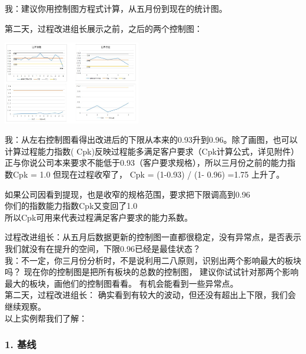 我：建议你用控制图方程式计算，从五月份到现在的统计图。

第二天，过程改进组长展示之前，之后的两个控制图：

\begin{description}
\item[]
\end{description}


\includegraphics[width=6cm]{控制图0.jpg}

我：从左右控制图看得出改进后的下限从本来的0.93升到0.96。除了画图，也可以计算过程能力指数(
Cpk)反映过程能多满足客户要求（Cpk计算公式，详见附件）\\
正与你说公司本来要求不能低于0.93（客户要求规格），所以三月份之前的能力指数Cpk
= 1.0 但现在过程收窄了， Cpk = (1-0.93) / (1- 0.96) =1.75 上升了。

如果公司因看到提现，也是收窄的规格范围，要求把下限调高到0.96\\
你们的指数能力指数Cpk又变回了1.0\\
所以Cpk可用来代表过程满足客户要求的能力系数。

过程改进组长：从五月后数据更新的控制图一直都很稳定，没有异常点，是否表示我们就没有在提升的空间，下限0.96已经是最佳状态？\\
我：不一定，你三月份分析时，不是说利用二八原则，识别出两个影响最大的板块吗？
现在你的控制图是把所有板块的总数的控制图，
建议你试试针对那两个影响最大的板块，画他们的控制图看看。
有机会能看到一些异常点。\\
第二天，过程改进组长：
确实看到有较大的波动，但还没有超出上下限，我们会继续观察。\\
以上实例帮我们了解：

\hypertarget{ux57faux7ebf}{%
\subsubsection{1. 基线}\label{ux57faux7ebf}}

